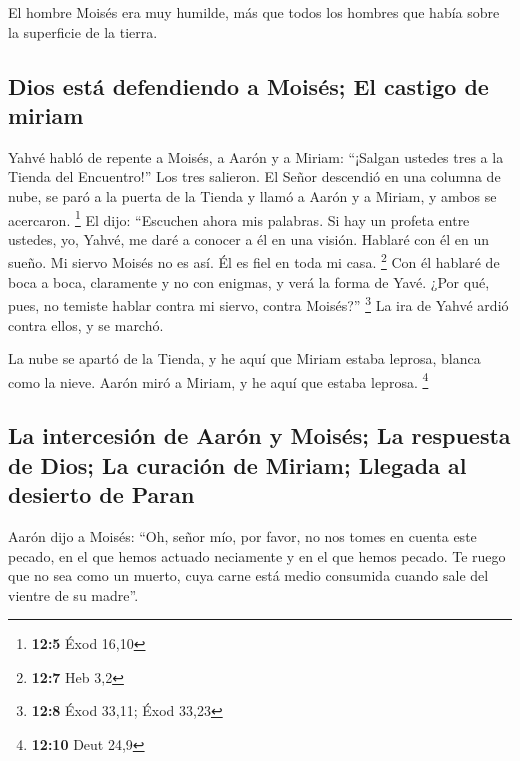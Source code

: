 \begin{paracol}{2}
 El hombre Moisés era muy humilde, más que todos los
hombres que había sobre la superficie de la tierra.

\hypertarget{dios-estuxe1-defendiendo-a-moisuxe9s-el-castigo-de-miriam}{%
\subsection{Dios está defendiendo a Moisés; El castigo de
miriam}\label{dios-estuxe1-defendiendo-a-moisuxe9s-el-castigo-de-miriam}}

 Yahvé habló de repente a Moisés, a Aarón y a Miriam:
``¡Salgan ustedes tres a la Tienda del Encuentro!'' Los tres salieron.
 El Señor descendió en una columna de nube, se paró a la
puerta de la Tienda y llamó a Aarón y a Miriam, y ambos se acercaron.
\footnote{\textbf{12:5} Éxod 16,10}  El dijo: ``Escuchen
ahora mis palabras. Si hay un profeta entre ustedes, yo, Yahvé, me daré
a conocer a él en una visión. Hablaré con él en un sueño. 
Mi siervo Moisés no es así. Él es fiel en toda mi casa. \footnote{\textbf{12:7}
  Heb 3,2}  Con él hablaré de boca a boca, claramente y no
con enigmas, y verá la forma de Yavé. ¿Por qué, pues, no temiste hablar
contra mi siervo, contra Moisés?'' \footnote{\textbf{12:8} Éxod 33,11;
  Éxod 33,23}  La ira de Yahvé ardió contra ellos, y se
marchó.

 La nube se apartó de la Tienda, y he aquí que Miriam
estaba leprosa, blanca como la nieve. Aarón miró a Miriam, y he aquí que
estaba leprosa. \footnote{\textbf{12:10} Deut 24,9}

\hypertarget{la-intercesiuxf3n-de-aaruxf3n-y-moisuxe9s-la-respuesta-de-dios-la-curaciuxf3n-de-miriam-llegada-al-desierto-de-paran}{%
\subsection{La intercesión de Aarón y Moisés; La respuesta de Dios; La
curación de Miriam; Llegada al desierto de
Paran}\label{la-intercesiuxf3n-de-aaruxf3n-y-moisuxe9s-la-respuesta-de-dios-la-curaciuxf3n-de-miriam-llegada-al-desierto-de-paran}}

 Aarón dijo a Moisés: ``Oh, señor mío, por favor, no nos
tomes en cuenta este pecado, en el que hemos actuado neciamente y en el
que hemos pecado.  Te ruego que no sea como un muerto,
cuya carne está medio consumida cuando sale del vientre de su madre''.


\end{paracol}
